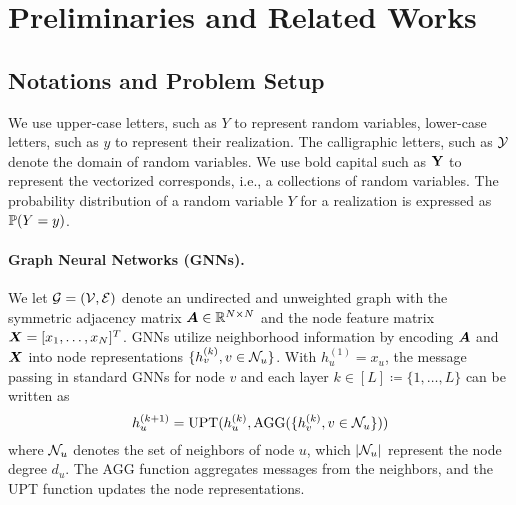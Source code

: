 \section{Preliminaries and Related Works}

\subsection{Notations and Problem Setup}

We use upper-case letters, such as $Y$ to represent random variables, lower-case letters, such as $y$ to represent their realization.
The calligraphic letters, such as ${\mathcal{Y}}$ denote the domain of random variables.
We use bold capital such as ${\mathbf{Y}}$ to represent the vectorized corresponds, i.e., a collections of random variables.
The probability distribution of a random variable $Y$ for a realization is expressed as $\mathbb{P}(Y=y)$.




\paragraph{Graph Neural Networks (GNNs).} 
We let ${\mathcal{G}} = ({\mathcal{V}},{\mathcal{E}})$ denote an undirected and unweighted graph with the symmetric adjacency matrix ${\bm{A}}\in\mathbb{R}^{N\times N}$ and the node feature matrix ${\bm{X}}=[x_1,\dots,x_N]^T$.
GNNs utilize neighborhood information by encoding ${\bm{A}}$ and ${\bm{X}}$ into node representations $\{h_{v}^{(k)}, v \in \mathcal{N}_u\}$.
With $h_u^{(1)}=x_u$, the message passing in standard GNNs for node $v$ and each layer $k \in [L] \coloneqq \{1,\dots,L\}$ can be written as
\begin{equation}
    h_u^{(k+1)} = \text{UPT}(h_u^{(k)}, \text{AGG}(\{h_{v}^{(k)}, v \in \mathcal{N}_u\})) \label{eq:gnn}
\end{equation}
where $\mathcal{N}_u$ denotes the set of neighbors of node $u$, which $|\mathcal{N}_u|$ represent the node degree $d_u$.
The AGG function aggregates messages
from the neighbors, and the UPT function updates the node
representations. 

